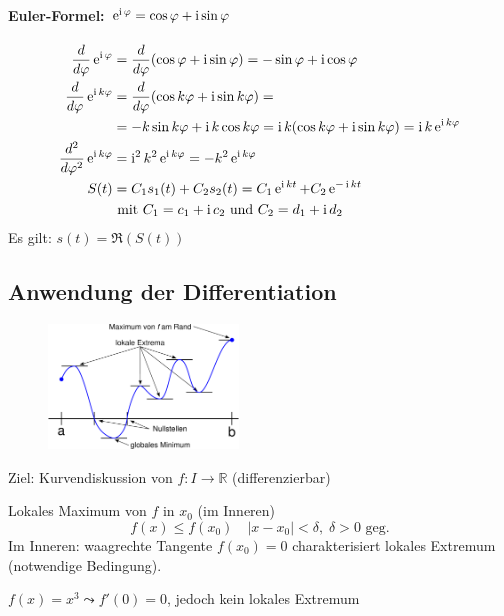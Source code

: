 \paragraph{Euler-Formel: $\operatorname{e}^{\operatorname{i}\varphi} = \cos \varphi + \operatorname{i} \sin \varphi$}
\begin{align*}
	\frac{d}{d\varphi}\operatorname{e}^{\operatorname{i}\varphi} &= \frac{d}{d\varphi}(\cos \varphi + \operatorname{i} \sin \varphi) = -\sin \varphi + \operatorname{i}\cos \varphi \\
	\frac{d}{d\varphi}\operatorname{e}^{\operatorname{i} k\varphi} &= \frac{d}{d\varphi}(\cos k\varphi + \operatorname{i} \sin k\varphi) =\\ &= -k\sin k\varphi + \operatorname{i} k\cos k\varphi = \operatorname{i} k(\cos k\varphi + \operatorname{i}\sin k\varphi) = \operatorname{i} k\operatorname{e}^{\operatorname{i} k\varphi} \\
	\frac{d^2}{d\varphi^2}\operatorname{e}^{\operatorname{i} k\varphi} &= \operatorname{i}^2k^2\operatorname{e}^{\operatorname{i} k\varphi} = -k^2 \operatorname{e}^{\operatorname{i} k\varphi} \\
	S(t) &= C_1s_1(t) + C_2s_2(t) = C_1\operatorname{e}^{\operatorname{i} kt} + C_2\operatorname{e}^{-\operatorname{i} kt} \\&\text{ mit $C_1 = c_1 + \operatorname{i} c_2$ und $C_2 = d_1 + \operatorname{i} d_2$}
\end{align*}
Es gilt: $s(t) = \Re(S(t))$

\subsection{Anwendung der Differentiation}
\begin{figure}
 	\begin{center}
		\includegraphics[width=0.45\textwidth]{include/20091201-1.pdf}
	\end{center}
\end{figure}
Ziel: Kurvendiskussion von $f: I \rightarrow \mathbb{R}$ (differenzierbar)
\begin{definition}
	Lokales Maximum von $f$ in $x_0$ (im Inneren)
	\begin{equation*}
		f(x) \leq f(x_0) \quad |x - x_0| < \delta,\;\delta>0\text{ geg.}
	\end{equation*}
	Im Inneren: waagrechte Tangente $f(x_0) = 0$ charakterisiert lokales Extremum (notwendige Bedingung).
\end{definition}
\begin{note}
	$f(x) = x^3 \leadsto f'(0) = 0$, jedoch kein lokales Extremum
\end{note}

